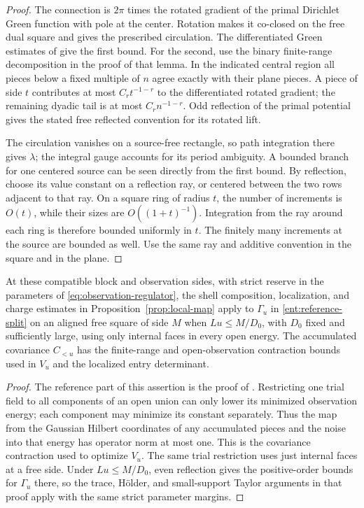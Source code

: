 \begin{proof}
The connection is \(2\pi\) times the rotated gradient of the primal
Dirichlet Green function with pole at the center.  Rotation makes it
co-closed on the free dual square and gives the prescribed circulation.
The differentiated Green estimates of \cite[Lemma~4.2]{B} give the
first bound.  For the second, use the binary finite-range decomposition
in the proof of that lemma.  In the indicated central region all
pieces below a fixed multiple of \(n\) agree exactly with their plane
pieces.  A piece of side \(t\) contributes at most \(C_rt^{-1-r}\)
to the differentiated rotated gradient; the remaining dyadic tail
is at most \(C_rn^{-1-r}\).  Odd reflection of the primal potential
gives the stated free reflected convention for its rotated lift.

The circulation vanishes on a source-free rectangle, so path
integration there gives \(\lambda\); the integral gauge accounts for
its period ambiguity.  A bounded branch for one centered source can
be seen directly from the first bound.  By reflection, choose its
value constant on a reflection ray, or centered between the two rows
adjacent to that ray.  On a square ring of radius \(t\), the number
of increments is \(O(t)\), while their sizes are \(O((1+t)^{-1})\).
Integration from the ray around each ring is therefore bounded
uniformly in \(t\).  The finitely many increments at the source are
bounded as well.  Use the same ray and additive convention in the
square and in the plane.
\end{proof}

\begin{lemma}\label{ent:entry-regulator}
At these compatible block and observation sides, with strict reserve in the parameters of
\eqref{eq:observation-regulator}, the shell composition,
localization, and charge estimates in Proposition~\ref{prop:local-map}
apply to \(\Gamma_u\) in \eqref{ent:reference-split} on an aligned
free square of side \(M\) when \(Lu\le M/D_0\), with \(D_0\) fixed
and sufficiently large, using only internal faces in every open
energy.  The accumulated covariance \(C_{<u}\) has the finite-range
and open-observation contraction bounds used in \(V_u\) and the
localized entry determinant.
\end{lemma}

\begin{proof}
The reference part of this assertion is the proof of
\cite[Lemma~9.2 and Lemma~4.1]{B}.  Restricting one trial field to all
components of an open union can only lower its minimized observation
energy; each component may minimize its constant separately.  Thus the
map from the Gaussian Hilbert coordinates of any accumulated pieces
and the noise into that energy has operator norm at most one.  This
is the covariance contraction used to optimize \(V_u\).  The same
trial restriction uses just internal faces at a free side.  Under
\(Lu\le M/D_0\), even reflection gives the positive-order bounds for
\(\Gamma_u\) there, so the trace,
H\"older, and small-support Taylor arguments in that proof apply with
the same strict parameter margins.
\end{proof}

